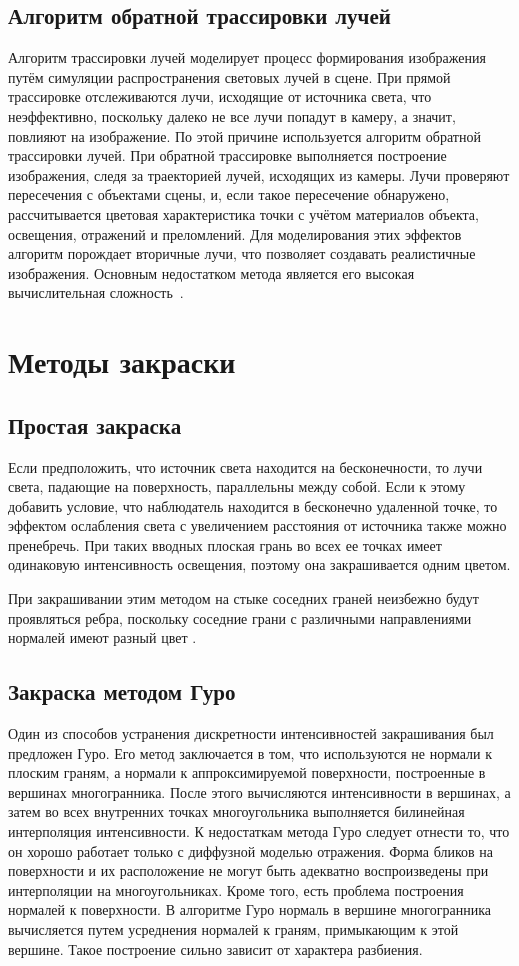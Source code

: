 \subsection{Алгоритм обратной трассировки лучей}
Алгоритм трассировки лучей моделирует процесс формирования изображения путём симуляции распространения световых лучей в сцене. При прямой трассировке отслеживаются лучи, исходящие от источника света, что неэффективно, поскольку далеко не все лучи попадут в камеру, а значит, повлияют на изображение. По этой причине используется алгоритм обратной трассировки лучей. При обратной трассировке выполняется построение изображения, следя за траекторией лучей, исходящих из камеры. Лучи проверяют пересечения с объектами сцены, и, если такое пересечение обнаружено, рассчитывается цветовая характеристика точки с учётом материалов объекта, освещения, отражений и преломлений. Для моделирования этих эффектов алгоритм порождает вторичные лучи, что позволяет создавать реалистичные изображения. Основным недостатком метода является его высокая вычислительная сложность~\cite{lit2, lit3}.

\section{Методы закраски}
\subsection{Простая закраска}
Если предположить, что источник света находится на бесконечности, то лучи света, падающие на поверхность, параллельны между собой. Если к этому добавить условие, что наблюдатель находится в бесконечно удаленной точке, то эффектом ослабления света с увеличением расстояния от источника также можно пренебречь. При таких вводных плоская грань во всех ее точках имеет одинаковую интенсивность освещения, поэтому она закрашивается одним цветом.

При закрашивании этим методом на стыке соседних граней неизбежно будут проявляться ребра, поскольку соседние грани с различными направлениями нормалей имеют разный цвет \cite{lit5}.

\subsection{Закраска методом Гуро}
Один из способов устранения дискретности интенсивностей закрашивания был предложен Гуро. Его метод заключается в том, что используются не нормали к плоским граням, а нормали к аппроксимируемой поверхности, построенные в вершинах многогранника. После этого вычисляются интенсивности в вершинах, а затем во всех внутренних точках многоугольника выполняется билинейная интерполяция интенсивности.
К недостаткам метода Гуро следует отнести то, что он хорошо работает только с диффузной моделью отражения. Форма бликов на поверхности и их расположение не могут быть адекватно воспроизведены при интерполяции на многоугольниках. Кроме того, есть проблема построения нормалей к поверхности. В алгоритме Гуро нормаль в вершине многогранника вычисляется путем усреднения нормалей к граням, примыкающим к этой вершине. Такое построение сильно зависит от характера разбиения. 

